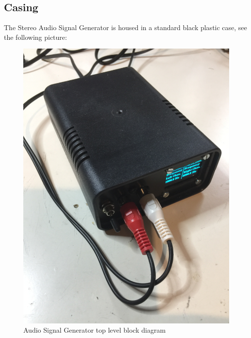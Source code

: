 \documentclass[11pt, oneside]{scrartcl}   	%
\begin{document}
\subsection{Casing}
The Stereo Audio Signal Generator is housed in a standard black plastic case, see the following picture:
\begin{figure}[tbph]
	\centering
	\includegraphics[width=\linewidth, angle=-90]{AudioSignalGeneratorTopFrontViewClosed.jpeg}
	\caption[Audio Signal Generator top level block diagram]{Audio Signal Generator top level block diagram}
	\label{fig:casing}
\end{figure}
\newpage
\end{document}
